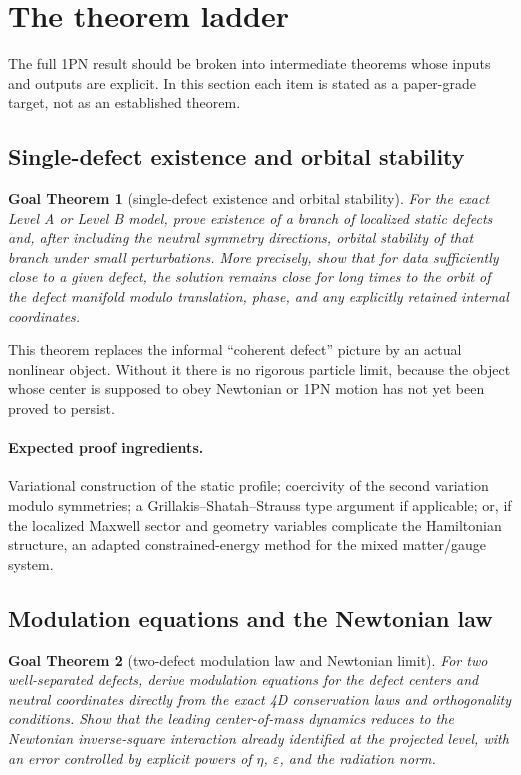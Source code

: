 \documentclass[11pt]{article}
\newcommand{\eps}{\varepsilon}
\newtheorem{goal}{Goal Theorem}
\begin{document}
\section{The theorem ladder}
\label{sec:ladder}

The full 1PN result should be broken into intermediate theorems whose inputs and outputs are explicit. In this section each item is stated as a paper-grade target, not as an established theorem.

\subsection{Single-defect existence and orbital stability}

\begin{goal}[single-defect existence and orbital stability]
For the exact Level A or Level B model, prove existence of a branch of localized static defects and, after including the neutral symmetry directions, orbital stability of that branch under small perturbations. More precisely, show that for data sufficiently close to a given defect, the solution remains close for long times to the orbit of the defect manifold modulo translation, phase, and any explicitly retained internal coordinates.
\end{goal}

This theorem replaces the informal ``coherent defect'' picture by an actual nonlinear object. Without it there is no rigorous particle limit, because the object whose center is supposed to obey Newtonian or 1PN motion has not yet been proved to persist.

\paragraph{Expected proof ingredients.}
Variational construction of the static profile; coercivity of the second variation modulo symmetries; a Grillakis--Shatah--Strauss type argument if applicable; or, if the localized Maxwell sector and geometry variables complicate the Hamiltonian structure, an adapted constrained-energy method for the mixed matter/gauge system.

\subsection{Modulation equations and the Newtonian law}

\begin{goal}[two-defect modulation law and Newtonian limit]
For two well-separated defects, derive modulation equations for the defect centers and neutral coordinates directly from the exact 4D conservation laws and orthogonality conditions. Show that the leading center-of-mass dynamics reduces to the Newtonian inverse-square interaction already identified at the projected level, with an error controlled by explicit powers of $\eta$, $\eps$, and the radiation norm.
\end{goal}
\end{document}
